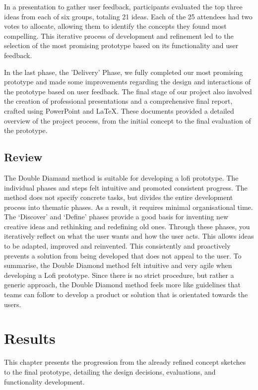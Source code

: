 \documentclass{article}
\begin{document}
In a presentation to gather user feedback, participants evaluated the top three ideas from each of six groups, totaling 21 ideas.
Each of the 25 attendees had two votes to allocate, allowing them to identify the concepts they found most compelling.
This iterative process of development and refinement led to the selection of the most promising prototype
based on its functionality and user feedback.

In the last phase, the 'Delivery' Phase, we fully completed our most promising prototype
and made some improvements regarding the design and interactions of the prototype based on user feedback.
The final stage of our project also involved the creation of professional presentations and a comprehensive final report,
crafted using PowerPoint and LaTeX. These documents provided a detailed overview of the project process,
from the initial concept to the final evaluation of the prototype.

\subsection{Review}
The Double Diamand method is suitable for developing a lofi prototype. The individual phases and steps felt intuitive and promoted consistent progress. The method does not specify concrete tasks, but divides the entire development process into thematic phases. As a result, it requires minimal organisational time. The ‘Discover’ and ‘Define’ phases provide a good basis for inventing new creative ideas and rethinking and redefining old ones. Through these phases, you iteratively reflect on what the user wants and how the user acts. This allows ideas to be adapted, improved and reinvented. This consistently and proactively prevents a solution from being developed that does not appeal to the user.
To summarise, the Double Diamond method felt intuitive and very agile when developing a Lofi prototype. Since there is no strict procedure, but rather a generic approach, the Double Diamond method feels more like guidelines that teams can follow to develop a product or solution that is orientated towards the users.


\section{Results}
This chapter presents the progression from the already refined concept sketches to the final prototype,
detailing the design decisions, evaluations, and functionality development.
\end{document}
